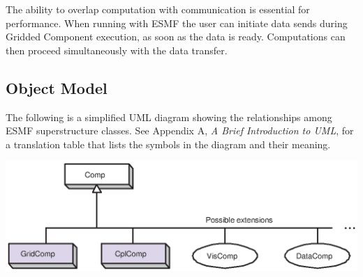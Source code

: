 The ability to overlap computation with communication is essential for
performance.  When running with ESMF the user can initiate data 
sends during Gridded Component execution, as soon as the data is ready.
Computations can then proceed simultaneously with the data transfer.

\newpage
\subsection{Object Model}

The following is a simplified UML diagram showing the relationships among
ESMF superstructure classes.  See Appendix A, {\it A Brief Introduction 
to UML}, for a translation table that lists the symbols in the diagram 
and their meaning.

\begin{center}
\includegraphics{Comp_obj.eps}   
\end{center}



